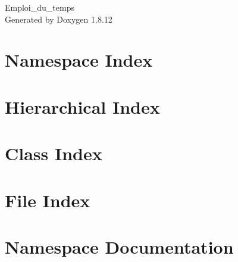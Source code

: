 \documentclass[twoside]{book}
\newcommand{\+}{\discretionary{\mbox{\scriptsize$\hookleftarrow$}}{}{}}
\newcommand{\clearemptydoublepage}{%
  \newpage{\pagestyle{empty}\cleardoublepage}%
}
\begin{document}
\hypersetup{pageanchor=false,
             bookmarksnumbered=true,
             pdfencoding=unicode
            }
\begin{titlepage}
\vspace*{7cm}
\begin{center}%
{\Large Emploi\+\_\+du\+\_\+temps }\\
\vspace*{1cm}
{\large Generated by Doxygen 1.8.12}\\
\end{center}
\end{titlepage}
\clearemptydoublepage
{}
\tableofcontents
\clearemptydoublepage
{}
\hypersetup{pageanchor=true}

\chapter{Namespace Index}

\chapter{Hierarchical Index}

\chapter{Class Index}

\chapter{File Index}

\chapter{Namespace Documentation}








\end{document}
